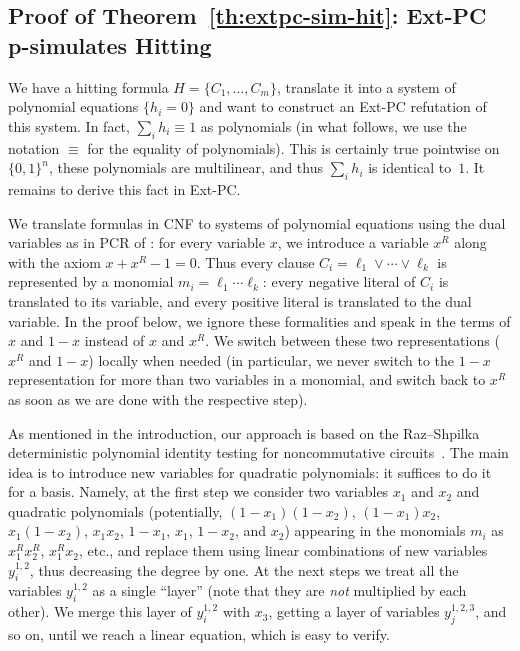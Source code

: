 \documentclass[11pt]{article}
\newcommand{\scterm}[1]{{\textrm{\sc #1}}}
\newcommand{\hit}{\scterm{Hitting}}
\newcommand{\extpc}{\scterm{Ext-PC}}
\newcommand{\pcr}{\scterm{PCR}}
\numberwithin{equation}{section}
\begin{document}
\subsection{Proof of Theorem~\ref{th:extpc-sim-hit}: {\extpc} p-simulates {\hit}}
We have a hitting formula $H=\{C_1,\dotsc,C_m\}$, translate it into a system of polynomial
equations $\{h_i=0\}$ and want to construct an {\extpc} refutation of this system. 
In fact, $\sum_ih_i \equiv 1$ as polynomials (in what follows, we use the notation
$\equiv$ for the equality of polynomials). 
This is certainly true pointwise on $\{0,1\}^n$, 
these polynomials are multilinear,
and thus $\sum_ih_i$ is identical to~$1$.
It remains to derive this fact in {\extpc}.

We translate formulas in CNF to systems of polynomial equations
using the dual variables as in {\pcr} of \cite{ABSRW02}: for every variable $x$,
we introduce a variable $x^R$ along with the axiom $x+x^R-1=0$.
Thus every clause $C_i=\ell_1\lor\dotsb\lor \ell_k$ 
is represented by a monomial $m_i=\ell_1\dotsb\ell_k$:
every negative literal of $C_i$ is translated to its variable,
and every positive literal is translated to the dual variable.
In the proof below, we ignore these formalities and speak
in the terms of $x$ and $1-x$ instead of $x$ and $x^R$.
We switch between these two representations ($x^R$ and $1-x$)
locally when needed (in particular, we never switch to the $1-x$
representation for more than two variables in a monomial,
and switch back to $x^R$ as soon as we are done with the respective step).

As mentioned in the introduction, our approach is based on the Raz--Shpilka deterministic polynomial identity testing
for noncommutative circuits~\cite{RS05}. 
The main idea is to introduce new variables for quadratic polynomials:
it suffices to do it for a basis. Namely, at the first step we consider
two variables $x_1$ and $x_2$ and quadratic polynomials
(potentially, 
$(1-x_1)(1-x_2)$,
$(1-x_1)x_2$, 
$x_1(1-x_2)$, 
$x_1x_2$, 
$1-x_1$, 
$x_1$, 
$1-x_2$, and 
$x_2$)
appearing in the monomials $m_i$ as $x_1^Rx_2^R$, $x_1^Rx_2$, etc., and replace them using linear combinations
of new variables $y^{1,2}_i$,
thus decreasing the degree by one.
At the next steps we treat all the variables $y^{1,2}_i$ as a single ``layer'' 
(note that they are \emph{not} multiplied by each other).
We merge this layer of $y^{1,2}_i$
with $x_3$, getting a layer of variables $y^{1,2,3}_j$, and so on, 
until we reach a linear equation, which is easy to verify.
\end{document}
